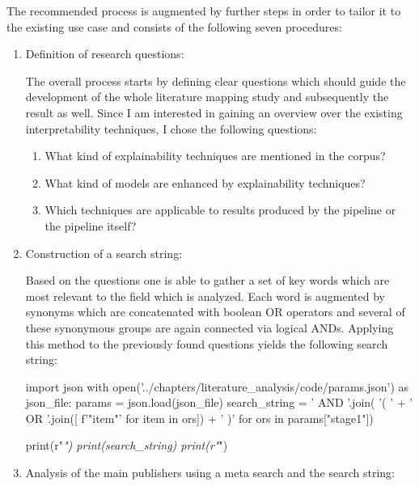 The recommended process is augmented by further steps in order to tailor it to the existing use case and consists of the following seven procedures:
\begin{enumerate}
	
	\item Definition of research questions:
	
	The overall process starts by defining clear questions which should guide the development of the whole literature mapping study and subsequently the result as well. Since I am interested in gaining an overview over the existing interpretability techniques, I chose the following questions:
	
	\begin{enumerate}
		\item What kind of explainability techniques are mentioned in the corpus?
		\item What kind of models are enhanced by explainability techniques?
		\item Which techniques are applicable to results produced by the pipeline or the pipeline itself?
	\end{enumerate}
	
	\item Construction of a search string:
	
	Based on the questions one is able to gather a set of key words which are most relevant to the field which is analyzed. Each word is augmented by synonyms which are concatenated with boolean OR operators and several of these synonymous groups are again connected via logical ANDs. Applying this method to the previously found questions yields the following search string:
	
\begin{pycode}
import json
with open('../chapters/literature_analysis/code/params.json') as json_file:
	params = json.load(json_file)
	search_string = ' AND '.join( '( ' + ' OR '.join([ f'"{item}"' for item in ors]) + ' )' for ors in params["stage1"])
	
	print(r"\textit{")
	print(search_string)
	print(r"}")
\end{pycode}
	
	
	\item Analysis of the main publishers using a meta search and the search string:
	

\end{enumerate}
